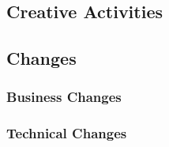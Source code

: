 		\subsection{Creative Activities} %

		\subsection{Changes} %

			\subsubsection{Business Changes} %

			\subsubsection{Technical Changes} %
